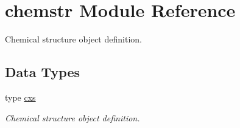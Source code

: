 \hypertarget{namespacechemstr}{}\section{chemstr Module Reference}
\label{namespacechemstr}


Chemical structure object definition.  


\subsection*{Data Types}
\begin{DoxyCompactItemize}
\item 
type \mbox{\hyperlink{structchemstr_1_1cxs}{cxs}}
\begin{DoxyCompactList}\small\item\em Chemical structure object definition. \end{DoxyCompactList}\end{DoxyCompactItemize}

